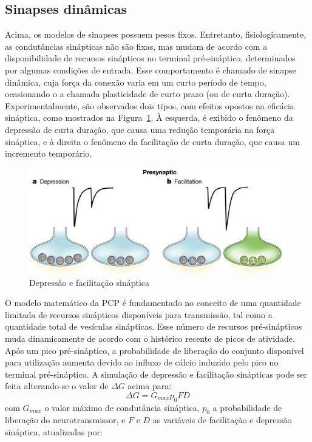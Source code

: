 \subsection{Sinapses dinâmicas}
Acima, os modelos de sinapses possuem pesos fixos. Entretanto, fisiologicamente, as condutâncias sinápticas não são fixas, mas mudam de acordo com a disponibilidade de recursos sinápticos no terminal pré-sináptico, determinados por algumas condições de entrada. Esse comportamento é chamado de sinapse dinâmica, cuja força da conexão varia em um curto período de tempo, ocasionando o a chamada plasticidade de curto prazo (ou de curta duração). Experimentalmente, são observados dois tipos, com efeitos opostos na eficácia sináptica, como mostrados na Figura~\ref{fig:plasticidadecurtaduracao}. À esquerda, é exibido o fenômeno da depressão de curta duração, que causa uma redução temporária na força sináptica, e à direita o fenômeno da facilitação de curta duração, que causa um incremento temporário.
\begin{figure}[tb]
	\centering
	\caption[Depressão e facilitação sináptica]{Depressão e facilitação sináptica}
	\label{fig:plasticidadecurtaduracao}
	\includegraphics[width=0.7\linewidth]{figs/plasticidade_curta_duracao}
\end{figure}
O modelo matemático da PCP é fundamentado no conceito de uma quantidade limitada de recursos sinápticos disponíveis para transmissão, tal como a quantidade total de vesículas sinápticas. Esse número de recursos pré-sinápticos muda dinamicamente de acordo com o histórico recente de picos de atividade. Após um pico pré-sináptico, a probabilidade de liberação do conjunto disponível para utilização aumenta devido ao influxo de cálcio induzido pelo pico no terminal pré-sináptico. A simulação de depressão e facilitação sinápticas pode ser feita alterando-se o valor de $\Delta G$ acima para:
\begin{equation}\label{eq:sinapse_facilitacao_depressao}
	\Delta G=G_{max}p_0FD
\end{equation}
com $G_{max}$ o valor máximo de condutância sináptica, $p_0$ a probabilidade de liberação do neurotransmissor, e $F$ e $D$ as variáveis de facilitação e depressão sináptica, atualizadas por:
